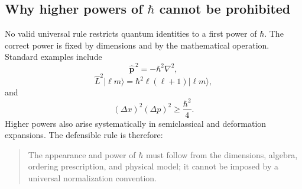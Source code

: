 \subsection{Why higher powers of \texorpdfstring{\(\hbar\)}{hbar} cannot be prohibited}

No valid universal rule restricts quantum identities to a first power of \(\hbar\). The correct power is fixed by dimensions and by the mathematical operation. Standard examples include
\begin{equation}
\hat{\bm{p}}^{\,2}=-\hbar^2\nabla^2,
\end{equation}
\begin{equation}
\hat L^2\lvert \ell m\rangle
=
\hbar^2\ell(\ell+1)\lvert \ell m\rangle,
\end{equation}
and
\begin{equation}
(\Delta x)^2(\Delta p)^2\geq\frac{\hbar^2}{4}.
\end{equation}
Higher powers also arise systematically in semiclassical and deformation expansions. The defensible rule is therefore:
\begin{quote}
The appearance and power of \(\hbar\) must follow from the dimensions, algebra, ordering prescription, and physical model; it cannot be imposed by a universal normalization convention.
\end{quote}
